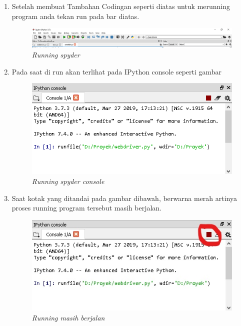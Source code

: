 \begin{enumerate}
\item Setelah membuat Tambahan Codingan  seperti diatas untuk merunning program anda tekan run pada bar diatas.
\begin{figure}[H]
    	\centering
    	\includegraphics[scale=0.3]{figures/run1.png}
    	\caption{\textit{Running spyder}}
    	\label{CLI}
	\end{figure}

\newpage

\item Pada saat di run akan terlihat pada IPython console seperti gambar 
\begin{figure}[H]
    	\centering
    	\includegraphics[scale=0.5]{figures/run2.png}
    	\caption{\textit{Running spyder console}}
    	\label{CLI}
	\end{figure}

\item Saat kotak yang ditandai pada gambar dibawah, berwarna merah artinya proses running program tersebut masih berjalan.
\begin{figure}[H]
    	\centering
    	\includegraphics[scale=0.5]{figures/run3.png}
    	\caption{\textit{Running masih berjalan}}
    	\label{CLI}
	\end{figure}


\end{enumerate}
